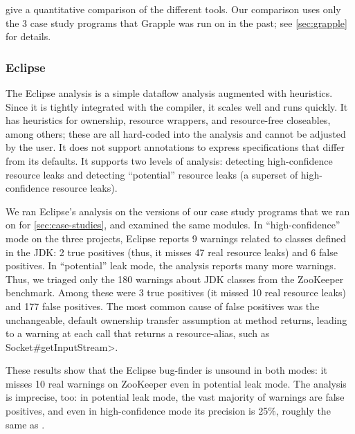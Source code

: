  give a quantitative comparison of the
different tools.  Our comparison uses only the 3 case study programs that Grapple was
run on in the past; see \cref{sec:grapple} for details.




\subsubsection{Eclipse}
\label{sec:eclipse}

The Eclipse analysis is a simple dataflow analysis
augmented with heuristics. Since it is tightly integrated with
the compiler, it scales well and runs quickly. It has
heuristics for ownership, resource wrappers, and resource-free
closeables, among others; these are all hard-coded into the analysis and cannot
be adjusted by the user. It does not support annotations to express
specifications that differ from its defaults.
It supports two levels of analysis: detecting high-confidence resource
leaks and detecting ``potential'' resource
leaks (a superset of high-confidence resource leaks).

We ran Eclipse's analysis on the versions of our case study programs
that we ran \tool on for \cref{sec:case-studies}, and examined
the same modules.
In ``high-confidence'' mode on the three projects, Eclipse reports 9
warnings related to classes defined in the JDK:
2 true positives (thus, it misses 47 real resource leaks) and 6
false positives.
In ``potential'' leak mode, the analysis reports many more warnings.
Thus, we triaged only the 180
warnings about JDK classes from the ZooKeeper benchmark.
Among these were 3 true positives (it missed 10 real resource leaks) and 177 false
positives.
The most common cause of false
positives was the unchangeable, default ownership transfer assumption
at method returns, leading to a warning at each call that returns a resource-alias, such as
\<Socket\#getInputStream>.

These results show that the Eclipse bug-finder is unsound in both
modes: it misses 10 real warnings on ZooKeeper even in potential leak mode.
The analysis is imprecise, too: in potential leak mode,
the vast majority of warnings are false positives, and even in high-confidence
mode its precision is 25\%, roughly the same as \tool.


